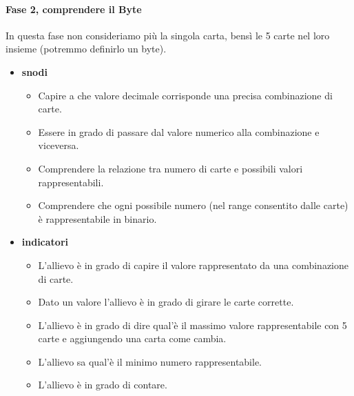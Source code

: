 \documentclass[a4paper]{article}
\begin{document}
\paragraph{Fase 2, comprendere il Byte}
In questa fase non consideriamo più la singola carta, bensì le 5 carte nel loro insieme (potremmo definirlo un byte).
\begin{itemize}
	\item \textbf{snodi}
		\begin{itemize}[label={--}]
			\item Capire a che valore decimale corrisponde una precisa combinazione di carte.
			\item Essere in grado di passare dal valore numerico alla combinazione e viceversa.
			\item Comprendere la relazione tra numero di carte e possibili valori rappresentabili.
			\item Comprendere che ogni possibile numero (nel range consentito dalle carte) è rappresentabile in binario.
		\end{itemize}
	\item \textbf{indicatori}
		\begin{itemize}[label={--}]
			\item L'allievo è in grado di capire il valore rappresentato da una combinazione di carte.
			\item Dato un valore l'allievo è in grado di girare le carte corrette.
			\item L'allievo è in grado di dire qual'è il massimo valore rappresentabile con 5 carte e aggiungendo una carta come cambia.
			\item L'allievo sa qual'è il minimo numero rappresentabile.
			\item L'allievo è in grado di contare.  
		\end{itemize}
\end{itemize}
\end{document}
